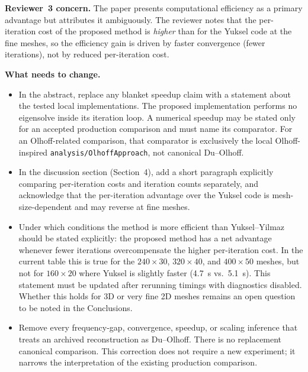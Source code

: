 \documentclass[12pt,a4paper]{article}
\begin{document}
\textbf{Reviewer~3 concern.}  The paper presents computational efficiency as
a primary advantage but attributes it ambiguously. The reviewer notes that the
per-iteration cost of the proposed method is \emph{higher} than for the Yuksel
code at the fine meshes, so the efficiency gain is driven by faster
convergence (fewer iterations), not by reduced per-iteration cost.

\textbf{What needs to change.}
\begin{itemize}[leftmargin=1.6em]
  \item In the abstract, replace any blanket speedup claim with a statement
        about the tested local implementations.  The proposed implementation
        performs no eigensolve inside its iteration loop.  A numerical
        speedup may be stated only for an accepted production comparison and
        must name its comparator.  For an Olhoff-related comparison, that
        comparator is exclusively the local Olhoff-inspired
        \texttt{analysis/OlhoffApproach}, not canonical Du--Olhoff.
  \item In the discussion section (Section~4), add a short paragraph
        explicitly comparing per-iteration costs and iteration counts
        separately, and acknowledge that the per-iteration advantage over
        the Yuksel code is mesh-size-dependent and may reverse at fine
        meshes.
  \item Under which conditions the method is more efficient than
        Yuksel--Yilmaz should be stated explicitly: the proposed method has
        a net advantage whenever fewer iterations overcompensate the higher
        per-iteration cost.  In the current table this is true for the
        $240{\times}30$, $320{\times}40$, and $400{\times}50$ meshes, but not
        for $160{\times}20$ where Yuksel is slightly faster (4.7~s vs.\
        5.1~s).  This statement must be updated after rerunning timings with
        diagnostics disabled.  Whether this holds for 3D or very fine 2D
        meshes remains an open question to be noted in the Conclusions.
  \item Remove every frequency-gap, convergence, speedup, or scaling
        inference that treats an archived reconstruction as Du--Olhoff.
        There is no replacement canonical comparison.  This correction does
        not require a new experiment; it narrows the interpretation of the
        existing production comparison.
\end{itemize}

\newpage
\end{document}

